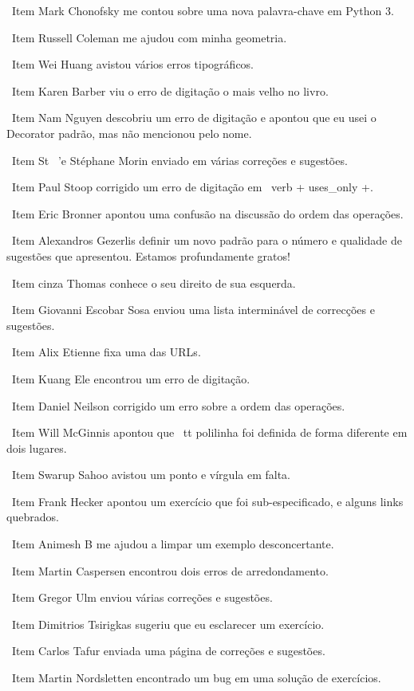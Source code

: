 \documentclass[10pt]{book}
\begin{document}
\ Item Mark Chonofsky me contou sobre uma nova palavra-chave em Python 3.

\ Item Russell Coleman me ajudou com minha geometria.

\ Item Wei Huang avistou vários erros tipográficos.

\ Item Karen Barber viu o erro de digitação o mais velho no livro.

\ Item Nam Nguyen descobriu um erro de digitação e apontou que eu usei o Decorator
padrão, mas não mencionou pelo nome.

\ Item St \ '{e} Stéphane Morin enviado em várias correções e sugestões.

\ Item Paul Stoop corrigido um erro de digitação em \ verb + uses_only +.

\ Item Eric Bronner apontou uma confusão na discussão do
ordem das operações.

\ Item Alexandros Gezerlis definir um novo padrão para o número e
qualidade de sugestões que apresentou. Estamos profundamente gratos!

\ Item cinza Thomas conhece o seu direito de sua esquerda.

\ Item Giovanni Escobar Sosa enviou uma lista interminável de correcções e
sugestões.

\ Item Alix Etienne fixa uma das URLs.

\ Item Kuang Ele encontrou um erro de digitação.

\ Item Daniel Neilson corrigido um erro sobre a ordem das operações.

\ Item Will McGinnis apontou que {\ tt polilinha} foi definida
de forma diferente em dois lugares.

\ Item Swarup Sahoo avistou um ponto e vírgula em falta.

\ Item Frank Hecker apontou um exercício que foi sub-especificado, e
alguns links quebrados.

\ Item Animesh B me ajudou a limpar um exemplo desconcertante.

\ Item Martin Caspersen encontrou dois erros de arredondamento.

\ Item Gregor Ulm enviou várias correções e sugestões.

\ Item Dimitrios Tsirigkas sugeriu que eu esclarecer um exercício.

\ Item Carlos Tafur enviada uma página de correções e sugestões.

\ Item Martin Nordsletten encontrado um bug em uma solução de exercícios.
\end{document}
